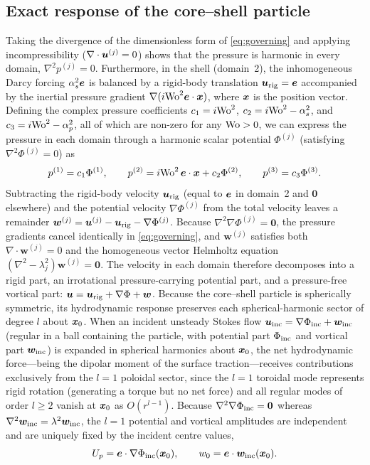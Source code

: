\subsection{Exact response of the core--shell particle}\label{sec:sphere}
Taking the divergence of the dimensionless form of \cref{eq:governing} and applying incompressibility
($\nabla\cdot\bm{u}^{(j)}=0$) shows that the pressure is harmonic in every domain, $\nabla^2p^{(j)}=0$. Furthermore, in the
shell (domain~2), the inhomogeneous Darcy forcing $\alpha_s^2\bm{e}$ is balanced by a rigid-body translation
$\bm{u}_{\rm rig}=\bm{e}$ accompanied by the inertial pressure gradient $\nabla(i\mathrm{Wo}^2\bm{e}\cdot\bm{x})$, where $\bm{x}$ is the
position vector. Defining the complex pressure coefficients $c_1=i\mathrm{Wo}^2$, $c_2=i\mathrm{Wo}^2-\alpha_s^2$, and
$c_3=i\mathrm{Wo}^2-\alpha_p^2$, all of which are non-zero for any $\mathrm{Wo}>0$, we can express the pressure in each domain through a
harmonic scalar potential $\Phi^{(j)}$ (satisfying $\nabla^2\Phi^{(j)}=0$) as
\begin{equation}
  p^{(1)}=c_1\Phi^{(1)},\qquad p^{(2)}=i\mathrm{Wo}^2\,\bm{e}\cdot\bm{x}+c_2\Phi^{(2)},\qquad p^{(3)}=c_3\Phi^{(3)}.
  \label{eq:pressures}
\end{equation}
Subtracting the rigid-body velocity $\bm{u}_{\rm rig}$ (equal to $\bm{e}$ in domain~2 and $\bm 0$ elsewhere) and the potential
velocity $\nabla\Phi^{(j)}$ from the total velocity leaves a remainder $\bm w^{(j)}=\bm{u}^{(j)}-\bm{u}_{\rm rig}-\nabla\Phi^{(j)}$.
Because $\nabla^2\nabla\Phi^{(j)}=\bm 0$, the pressure gradients cancel identically in \cref{eq:governing}, and
$\bm w^{(j)}$ satisfies both $\nabla\cdot\bm w^{(j)}=0$ and the homogeneous vector Helmholtz equation
$(\nabla^2-\lambda_j^2)\bm w^{(j)}=\bm 0$. The velocity in each domain therefore decomposes into a rigid part, an
irrotational pressure-carrying potential part, and a pressure-free vortical part: $\bm{u}=\bm{u}_{\rm rig}+\nabla\Phi+\bm w$.
Because the core--shell particle is spherically symmetric, its hydrodynamic response preserves each spherical-harmonic
sector of degree $l$ about $\bm{x}_0$. When an incident unsteady Stokes flow $\bm{u}_{\rm inc}=\nabla\Phi_{\rm inc}+\bm w_{\rm
inc}$ (regular in a ball containing the particle, with potential part $\Phi_{\rm inc}$ and vortical part $\bm w_{\rm inc}$)
is expanded in spherical harmonics about $\bm{x}_0$, the net hydrodynamic force---being the dipolar moment of the surface
traction---receives contributions exclusively from the $l=1$ poloidal sector, since the $l=1$ toroidal mode represents
rigid rotation (generating a torque but no net force) and all regular modes of order $l\ge2$ vanish at $\bm{x}_0$ as
$O(r^{l-1})$. Because $\nabla^2\nabla\Phi_{\rm inc}=\bm 0$ whereas $\nabla^2\bm w_{\rm inc}=\lambda^2\bm w_{\rm inc}$, the
$l=1$ potential and vortical amplitudes are independent and are uniquely fixed by the incident centre values,
\begin{equation}
  U_p=\bm{e}\cdot\nabla\Phi_{\rm inc}(\bm{x}_0),\qquad w_0=\bm{e}\cdot\bm w_{\rm inc}(\bm{x}_0).
  \label{eq:centre_values}
\end{equation}

